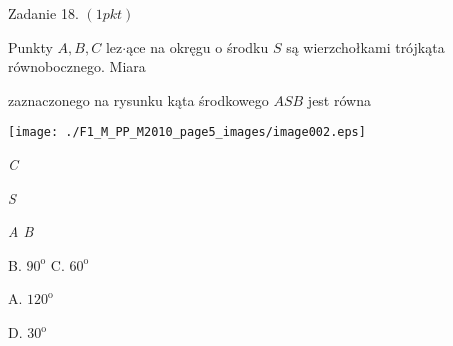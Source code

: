 \documentclass[a4paper,12pt]{article}
\begin{document}
Zadanie 18. $(1pkt)$

Punkty $A, B, C$ lez$\cdot$ące na okręgu o środku $S$ są wierzchołkami trójkąta równobocznego. Miara

zaznaczonego na rysunku kąta środkowego $ASB$ jest równa
\begin{center}
\texttt{[image: ./F1\_M\_PP\_M2010\_page5\_images/image002.eps]}
\end{center}
{\it C}

{\it S}

{\it A  B}

B. $90^{\mathrm{o}}$  C. $60^{\mathrm{o}}$

A. $120^{\mathrm{o}}$

D. $30^{\mathrm{o}}$
\end{document}
